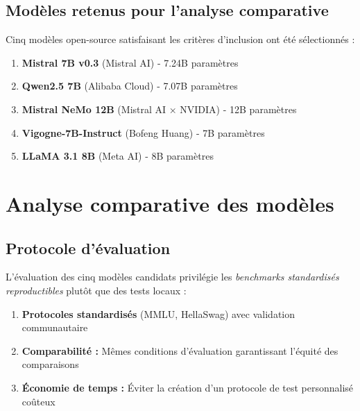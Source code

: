 \subsection{Modèles retenus pour l'analyse comparative}

Cinq modèles open-source satisfaisant les critères d'inclusion ont été sélectionnés :

\begin{enumerate}
    \item \textbf{Mistral 7B v0.3} (Mistral AI) - 7.24B paramètres \citep{jiang2023mistral}
    
    \item \textbf{Qwen2.5 7B} (Alibaba Cloud) - 7.07B paramètres \citep{yang2024qwen25}
    
    \item \textbf{Mistral NeMo 12B} (Mistral AI × NVIDIA) - 12B paramètres
    
    \item \textbf{Vigogne-7B-Instruct} (Bofeng Huang) - 7B paramètres
    
    \item \textbf{LLaMA 3.1 8B} (Meta AI) - 8B paramètres
\end{enumerate}

\section{Analyse comparative des modèles}

\subsection{Protocole d'évaluation}

L'évaluation des cinq modèles candidats privilégie les \textit{benchmarks standardisés reproductibles} plutôt que des tests locaux :

\begin{enumerate}
    \item \textbf{Protocoles standardisés} (MMLU, HellaSwag) avec validation communautaire
    
    \item \textbf{Comparabilité :} Mêmes conditions d'évaluation garantissant l'équité des comparaisons
    
    \item \textbf{Économie de temps :} Éviter la création d'un protocole de test personnalisé coûteux
\end{enumerate}


